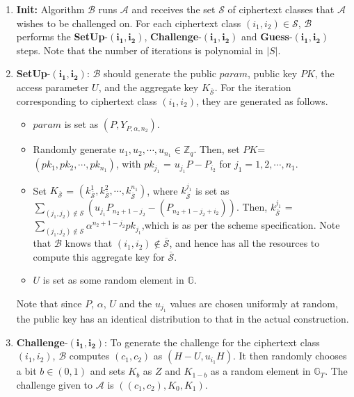 \begin{enumerate}
 \item \textbf{Init:} Algorithm $\mathcal{B}$ runs $\mathcal{A}$ and receives the set $\mathcal{S}$ of ciphertext classes that $\mathcal{A}$ wishes to be challenged on. For each ciphertext class $(i_1,i_2)\in\mathcal{S}$, $\mathcal{B}$ performs the \textbf{SetUp}-$\mathbf{(i_1,i_2)}$, \textbf{Challenge}-$\mathbf{(i_1,i_2)}$ and \textbf{Guess}-$\mathbf{(i_1,i_2)}$ steps. Note that the number of iterations is polynomial in $|S|$. 
 
 \item \textbf{SetUp}-$\mathbf{(i_1,i_2)}$: $\mathcal{B}$ should generate the public $param$, public key $PK$, the access parameter $U$, and the aggregate key $K_{\overline{\mathcal{S}}}$. For the iteration corresponding to ciphertext class $(i_1,i_2)$, they are generated as follows.
 \begin{itemize}
  \item $param$ is set as $(P,Y_{P,\alpha,n_2})$.
  \item Randomly generate $u_1,u_2,\cdots,u_{n_1} \in \mathbb{Z}_q$. Then, set $PK$=\\$(pk_1,pk_2,\cdots,pk_{n_1})$, with $pk_{j_1}$ = $u_{j_1}P - P_{i_2}$ for $j_1=1,2,\cdots,n_1$.
  \item Set $K_{\overline{\mathcal{S}}}$ = $(k^{1}_{\overline{\mathcal{S}}},k^{2}_{\overline{\mathcal{S}}},\cdots,k^{n_1}_{\overline{\mathcal{S}}})$, where $k^{j_1}_{\overline{\mathcal{S}}}$ is set as $\sum_{(j_1,j_2)\notin\mathcal{S}}({u_{j_1}}P_{n_2+1-j_2}-(P_{n_2+1-j_2+i_2}))$. Then, $k^{j_1}_{\overline{\mathcal{S}}}$ = $\sum_{(j_1,j_2)\notin\mathcal{S}}\alpha^{n_2+1-j_2}pk_{j_1}$,which is as per the scheme specification. Note that $\mathcal{B}$ knows that $(i_1,i_2)\notin \overline{\mathcal{S}}$, and hence has all the resources to compute this aggregate key for $\overline{\mathcal{S}}$. 
  \item $U$ is set as some random element in $\mathbb{G}$.
 \end{itemize}
 
 Note that since $P$, $\alpha$, $U$ and the $u_{j_1}$ values are chosen uniformly at random, the public key has an identical distribution to that in the actual construction.
 
 \item \textbf{Challenge}-$\mathbf{(i_1,i_2)}$: To generate the challenge for the ciphertext class $(i_1,i_2)$, $\mathcal{B}$ computes $(c_1,c_2)$ as $(H-U,u_{i_1}H)$. It then randomly chooses a bit $b\in{(0,1)}$ and sets $K_b$ as $Z$ and $K_{1-b}$ as a random element in $\mathbb{G}_T$. The challenge given to $\mathcal{A}$ is $((c_1,c_2),K_0,K_1)$. 
 

\end{enumerate}
